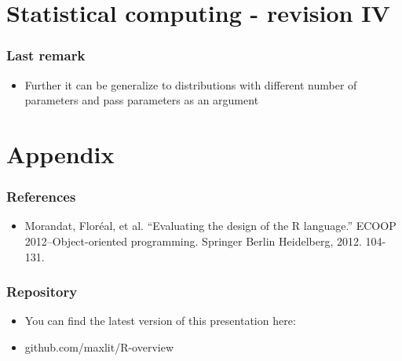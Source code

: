 \documentclass[bigger]{beamer}
\begin{document}
\section{Statistical computing - revision IV}
\label{sec-9}
\begin{frame}
\frametitle{Last remark}
\label{sec-9-1}
\begin{itemize}

\item Further it can be generalize to distributions with different number of parameters and pass parameters as an argument
\label{sec-9-1-1}%
\end{itemize} %
\end{frame}
\section{Appendix}
\label{sec-10}
\begin{frame}
\frametitle{References}
\label{sec-10-1}
\begin{itemize}

\item Morandat, Floréal, et al. ``Evaluating the design of the R language.'' ECOOP 2012–Object-oriented programming. Springer Berlin Heidelberg, 2012. 104-131.
\label{sec-10-1-1}%
\end{itemize} %
\end{frame}
\begin{frame}
\frametitle{Repository}
\label{sec-10-2}
\begin{itemize}

\item You can find the latest version of this presentation here:
\label{sec-10-2-1}%

\item github.com/maxlit/R-overview
\label{sec-10-2-2}%
\end{itemize} %
\end{frame}
\end{document}
